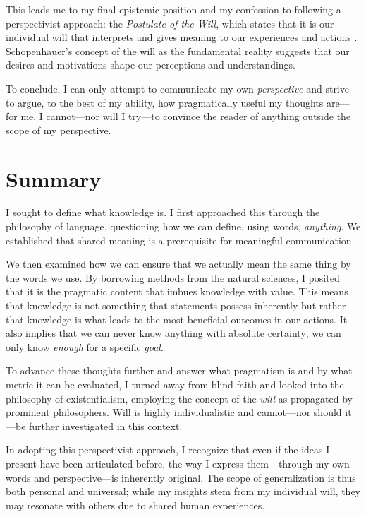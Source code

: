 This leads me to my final epistemic position and my confession to following a perspectivist approach: the \textit{Postulate of the Will}, which states that it is our individual will that interprets and gives meaning to our experiences and actions \parencite{schopenhauer2009world}. Schopenhauer's concept of the will as the fundamental reality suggests that our desires and motivations shape our perceptions and understandings.

To conclude, I can only attempt to communicate my own \textit{perspective} and strive to argue, to the best of my ability, how pragmatically useful my thoughts are—for me. I cannot—nor will I try—to convince the reader of anything outside the scope of my perspective.

\section*{Summary}

I sought to define what knowledge is. I first approached this through the philosophy of language, questioning how we can define, using words, \textit{anything}. We established that shared meaning is a prerequisite for meaningful communication.

We then examined how we can ensure that we actually mean the same thing by the words we use. By borrowing methods from the natural sciences, I posited that it is the pragmatic content that imbues knowledge with value. This means that knowledge is not something that statements possess inherently but rather that knowledge is what leads to the most beneficial outcomes in our actions. It also implies that we can never know anything with absolute certainty; we can only know \textit{enough} for a specific \textit{goal}.

To advance these thoughts further and answer what pragmatism is and by what metric it can be evaluated, I turned away from blind faith and looked into the philosophy of existentialism, employing the concept of the \textit{will} as propagated by prominent philosophers. Will is highly individualistic and cannot—nor should it—be further investigated in this context.

In adopting this perspectivist approach, I recognize that even if the ideas I present have been articulated before, the way I express them—through my own words and perspective—is inherently original. The scope of generalization is thus both personal and universal; while my insights stem from my individual will, they may resonate with others due to shared human experiences.

